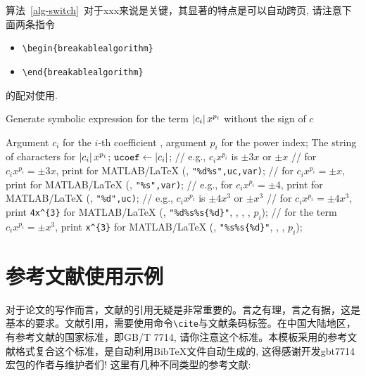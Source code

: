 算法~\ref{alg-switch}~对于xxx来说是关键，其显著的特点是可以自动跨页, 
请注意下面两条指令
\begin{itemize}
\item \lstinline|\begin{breakablealgorithm}|
\item \lstinline|\end{breakablealgorithm}|
\end{itemize}
的配对使用. 

\begin{breakablealgorithm}
\caption{Generate symbolic expression for the term $\left| c_i \right|x^{p_i}$ without the sign of $c$} \label{alg-switch}
\begin{algorithmic}[1]
\Require Argument $c_i$ for the $i$-th coefficient , argument $p_i$ for the power index;
\Ensure The string of characters for $\left| c_i \right|x^{p_i}$; 
\State $\texttt{ucoef} \gets \left| c_i \right|$;
  \quad // e.g.,  $c_ix^{p_i}$ is $\pm 3x$ or $\pm x$
    \quad // for $c_ix^{p_i}=\pm 3x$, print  for MATLAB/\LaTeX
      \State {}(, \lstinline|"%d%s",uc,var)|; 
   \Else \quad // for $c_ix^{p_i}=\pm x$, print  for MATLAB/\LaTeX
       \State {}(, \lstinline|"%s",var)|; 
   \EndIf
\EndCase
{} \quad // e.g., for $c_ix^{p_i}=\pm 4$, print  for MATLAB/\LaTeX
   \State {}(, \lstinline|"%d",uc)|;
\EndCase
\Default \quad // e.g.,  $c_ix^{p_i}$ is $\pm 4x^3$ or $\pm x^3$
    \quad // for $c_ix^{p_i}=\pm 4x^3$, print \lstinline|4x^{3}| for MATLAB/\LaTeX
      \State {}(, \lstinline|"%d%s%s{%d}"|, , , , $p_i$);
   \Else \quad // for the term  $c_ix^{p_i}=\pm x^3$, print \lstinline|x^{3}| for MATLAB/\LaTeX
       \State {}(, \lstinline|"%s%s{%d}"|, , , $p_i$);
   \EndIf
\EndDefault
\EndSwitch
\EndFunction
\end{algorithmic}
\end{breakablealgorithm}





\section{参考文献使用示例}

对于论文的写作而言，文献的引用无疑是非常重要的。言之有理，言之有据，这是基本的要求。文献引用，需要使用命令\lstinline|\cite|与文献条码标签。在中国大陆地区，有参考文献的国家标准，即GB/T 7714, 请你注意这个标准。本模板采用的参考文献格式复合这个标准，是自动利用BibTeX文件自动生成的, 这得感谢开发gbt7714宏包的作者与维护者们! 这里有几种不同类型的参考文献:

